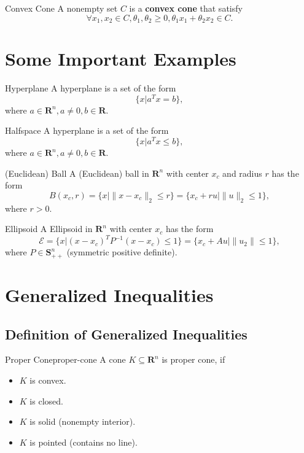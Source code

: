 \begin{definition}{Convex Cone}{}
    A nonempty set $C$ is a \textbf{convex cone} that satisfy $$\forall x_1,x_2\in C, \theta_1,\theta_2\geq 0,\theta_1 x_1+\theta_2 x_2\in C.$$
\end{definition}

\section{Some Important Examples}

\begin{definition}{Hyperplane}{}
    A hyperplane is a set of the form $$\{x|a^Tx=b\},$$ where $a\in\mathbf{R}^n,a\neq 0,b\in\mathbf{R}$.
\end{definition}

\begin{definition}{Halfspace}{}
    A hyperplane is a set of the form $$\{x|a^Tx\leq b\},$$ where $a\in\mathbf{R}^n,a\neq 0,b\in\mathbf{R}$.
\end{definition}

\begin{definition}{(Euclidean) Ball}{}
    A (Euclidean) ball in $\mathbf{R}^n$ with center $x_c$ and radius $r$ has the form $$B(x_c,r)=\{x\vert\|x-x_c\|_2\leq r\}=\{x_c+ru\vert\|u\|_2\leq 1\},$$ where $r>0$.
\end{definition}

\begin{definition}{Ellipsoid}{}
    A Ellipsoid in $\mathbf{R}^n$ with center $x_c$ has the form $$\mathcal{E}=\{x\vert(x-x_c)^TP^{-1}(x-x_c)\leq 1\}=\{x_c+Au\vert \|u_2\|\leq 1\},$$ where $P\in\mathbf{S}^{n}_{++}$ (symmetric positive definite).
\end{definition}

\section{Generalized Inequalities}

\subsection{Definition of Generalized Inequalities}

\begin{definition}{Proper Cone}{proper-cone}
    A cone $K\subseteq\mathbf{R}^n$ is proper cone, if
    \begin{itemize}
        \item $K$ is convex.
        \item $K$ is closed.
        \item $K$ is solid (nonempty interior).
        \item $K$ is pointed (contains no line).
    \end{itemize}
\end{definition}

